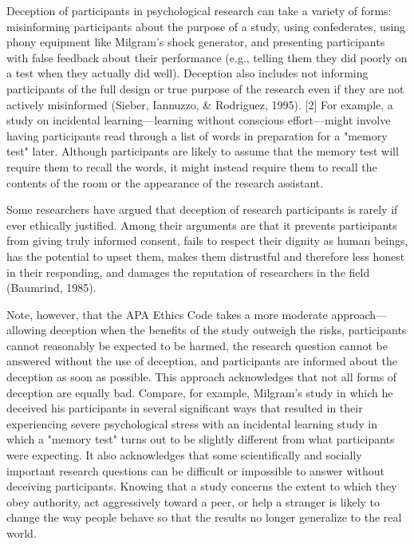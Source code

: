 Deception of participants in psychological research can take a variety of forms: misinforming participants about the purpose of a study, using confederates, using phony equipment like Milgram's shock generator, and presenting participants with false feedback about their performance (e.g., telling them they did poorly on a test when they actually did well). Deception also includes not informing participants of the full design or true purpose of the research even if they are not actively misinformed (Sieber, Iannuzzo, \& Rodriguez, 1995). [2] For example, a study on incidental learning---learning without conscious effort---might involve having participants read through a list of words in preparation for a "memory test" later. Although participants are likely to assume that the memory test will require them to recall the words, it might instead require them to recall the contents of the room or the appearance of the research assistant.


Some researchers have argued that deception of research participants is rarely if ever ethically justified. Among their arguments are that it prevents participants from giving truly informed consent, fails to respect their dignity as human beings, has the potential to upset them, makes them distrustful and therefore less honest in their responding, and damages the reputation of researchers in the field (Baumrind, 1985).


Note, however, that the APA Ethics Code takes a more moderate approach---allowing deception when the benefits of the study outweigh the risks, participants cannot reasonably be expected to be harmed, the research question cannot be answered without the use of deception, and participants are informed about the deception as soon as possible. This approach acknowledges that not all forms of deception are equally bad. Compare, for example, Milgram's study in which he deceived his participants in several significant ways that resulted in their experiencing severe psychological stress with an incidental learning study in which a "memory test" turns out to be slightly different from what participants were expecting. It also acknowledges that some scientifically and socially important research questions can be difficult or impossible to answer without deceiving participants. Knowing that a study concerns the extent to which they obey authority, act aggressively toward a peer, or help a stranger is likely to change the way people behave so that the results no longer generalize to the real world.


